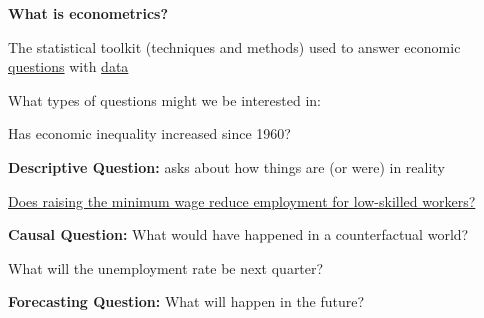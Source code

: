 \documentclass[11pt, aspectratio=169]{beamer}
\newenvironment{wideitemize}{\itemize\addtolength{\itemsep}{5pt}}{\enditemize}
\newenvironment{wideenumerate}{\enumerate\addtolength{\itemsep}{5pt}}{\endenumerate}
\begin{document}
\begin{frame}{\bf \large What is econometrics?}
	
	\vspace{0.2cm}
	The statistical toolkit (techniques and methods) used to answer economic \underline{questions} with \underline{data}
	\bigskip 
	
	\pause
	What types of questions might we be interested in: 
	\medskip
	
	\begin{wideenumerate}
		\item<1-> Has economic inequality increased since 1960?
		\begin{wideitemize}
			\item<3-> \textbf{Descriptive Question:} asks about how things are (or were) in reality
		\end{wideitemize}
		\item<1-> \href{http://davidcard.berkeley.edu/papers/njmin-aer.pdf}{Does raising the minimum wage reduce employment for low-skilled workers?}
		\begin{wideitemize}
			\item<4-> \textbf{Causal Question:} What would have happened in a counterfactual world?  
		\end{wideitemize}
		\item<1->   What will the unemployment rate be next quarter?
		\begin{wideitemize}
			\item<5-> \textbf{Forecasting Question:} What will happen in the future?  
		\end{wideitemize}

	\end{wideenumerate}
	
\end{frame}
\end{document}
